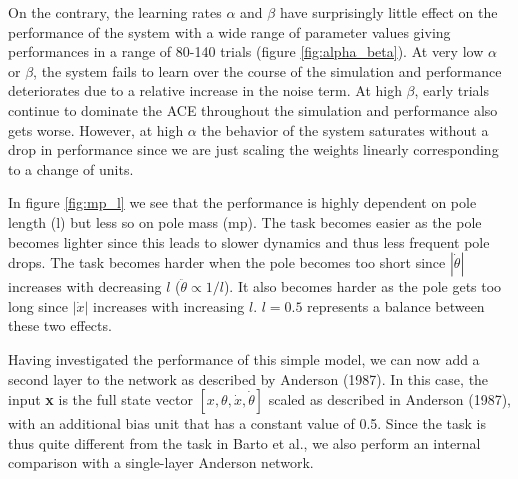 \documentclass{article}
\begin{document}
On the contrary, the learning rates $\alpha$ and $\beta$ have surprisingly little effect on the performance of the system with a wide range of parameter values giving performances in a range of 80-140 trials (figure \ref{fig:alpha_beta}). At very low $\alpha$ or $\beta$, the system fails to learn over the course of the simulation and performance deteriorates due to a relative increase in the noise term. At high $\beta$, early trials continue to dominate the ACE throughout the simulation and performance also gets worse. However, at high $\alpha$ the behavior of the system saturates without a drop in performance since we are just scaling the weights linearly corresponding to a change of units.

In figure \ref{fig:mp_l} we see that the performance is highly dependent on pole length (l) but less so on pole mass (mp). The task becomes easier as the pole becomes lighter since this leads to slower dynamics and thus less frequent pole drops. The task becomes harder when the pole becomes too short since $|\dot \theta|$ increases with decreasing $l$ ($\ddot \theta \propto 1/l$). It also becomes harder as the pole gets too long since $|\dot x|$ increases with increasing $l$. $l = 0.5$ represents a balance between these two effects. 

Having investigated the performance of this simple model, we can now add a second layer to the network  as described by Anderson (1987).  In this case, the input \textbf{x} is the full state vector $[x, \theta, \dot x, \dot \theta]$ scaled as described in Anderson (1987), with an additional bias unit that has a constant value of 0.5. Since the task is thus quite different from the task in Barto et al., we also perform an internal comparison with a single-layer Anderson network. 
\end{document}
